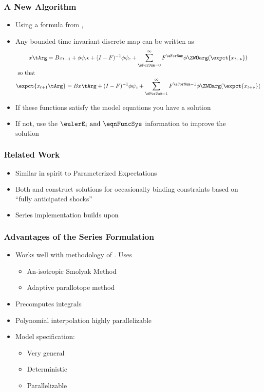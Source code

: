 \documentclass[notheorems]{beamer}
\begin{document}
\begin{frame}
  \frametitle{A New Algorithm}
 {\small  
\begin{itemize}
\item Using a formula from \citep{anderson10},
 \item Any bounded time invariant discrete map can be written as
    \begin{gather*}
      	 x\tArg =B x_{t-1}+ \phi \psi_\epsilon\epsilon + (I - F)^{-1} \phi \psi_c + \sum_{\sForSum=0}^\infty F^\sForSum \phi \ZWOarg(\expct{x_{t+\nu}})\\ \intertext{ so that}
\expct{ x_{t+1}\tArg} =B x\tArg  + (I - F)^{-1} \phi \psi_c+ \sum_{\sForSum =1}^\infty F^{\sForSum-1} \phi \ZWOarg(\expct{x_{t+\nu}}) 
    \end{gather*}
   \item If these functions satisfy the model equations you have a solution
   \item If not, use the $\eulerE_i \text{ and } \eqnFuncSys $ information to improve the solution
  \end{itemize}
}
\end{frame}

\begin{frame}
  \frametitle{Related Work}
  \begin{itemize}
\item Similar in spirit to Parameterized Expectations\cite{haan90:_solvin_stoch}
\item Both \cite{holden15:_exist_dsge} and  \cite{guerrieri15:_occbin}
 construct solutions for occasionally binding constraints based on ``fully anticipated shocks''
\item Series implementation builds upon \cite{Judd2014}
  \end{itemize}
\end{frame}

\begin{frame}
  \frametitle{Advantages of the Series Formulation}
  \begin{itemize}
  \item Works well with methodology of  \cite{Judd2014}.  Uses
    \begin{itemize}
    \item An-isotropic Smolyak Method 
    \item Adaptive parallotope method
    \end{itemize}
  \item Precomputes integrals
  \item Polynomial interpolation highly parallelizable
  \item Model specification: 
    \begin{itemize}
    \item Very general 
\item Deterministic 
    \item Parallelizable 
    \end{itemize}
  \end{itemize}
\end{frame}
\end{document}
